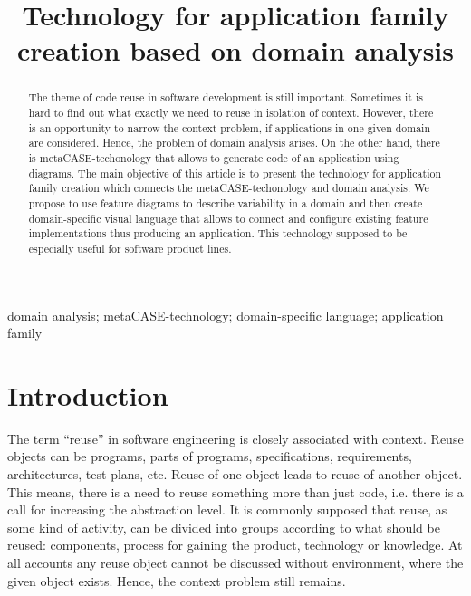\documentclass[conference]{IEEEtran}
\begin{document}
\title{Technology for application family creation based on domain analysis}

\author{
\and
}

\maketitle

\begin{abstract}
The theme of code reuse in software development is still important. Sometimes it is hard to find out what exactly we need to reuse in isolation of context. However, there is an opportunity to narrow the context problem, if applications in one given domain are considered. Hence, the problem of domain analysis arises. On the other hand, there is metaCASE-techonology that allows to generate code of an application using diagrams. The main objective of this article is to present the technology for application family creation which connects the metaCASE-techonology and domain analysis. We propose to use feature diagrams to describe variability in a domain and then create domain-specific visual language that allows to connect and configure existing feature implementations thus producing an application. This technology supposed to be especially useful for software product lines.
\end{abstract}

\begin{IEEEkeywords} domain analysis; metaCASE-technology; domain-specific language; application family \end{IEEEkeywords}

\section{Introduction}
The term ``reuse'' in software engineering is closely associated with context. Reuse objects can be programs, parts of programs, specifications, requirements, architectures, test plans, etc. Reuse of one object leads to reuse of another object. This means, there is a need to reuse something more than just code, i.e. there is a call for increasing the abstraction level. It is commonly supposed that reuse, as some kind of activity, can be divided into groups according to what should be reused: components, process for gaining the product, technology or knowledge. At all accounts any reuse object cannot be discussed without environment, where the given object exists. Hence, the context problem still remains. 
\end{document}
